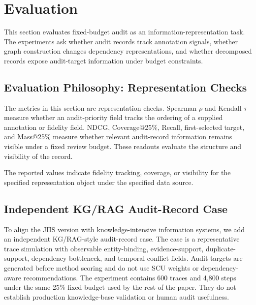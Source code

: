 \documentclass[pdflatex,sn-mathphys-num,iicol]{sn-jnl}
\begin{document}
\FloatBarrier

\section{Evaluation}
\label{sec:application}
\label{sec:experimental-results}

This section evaluates fixed-budget audit as an information-representation task. The experiments ask whether audit records track annotation signals, whether graph construction changes dependency representations, and whether decomposed records expose audit-target information under budget constraints.

\subsection{Evaluation Philosophy: Representation Checks}
\label{sec:evaluation-philosophy}

The metrics in this section are representation checks. Spearman $\rho$ and Kendall $\tau$ measure whether an audit-priority field tracks the ordering of a supplied annotation or fidelity field. NDCG, Coverage@25\%, Recall, first-selected target, and Mass@25\% measure whether relevant audit-record information remains visible under a fixed review budget. These readouts evaluate the structure and visibility of the record.

The reported values indicate fidelity tracking, coverage, or visibility for the specified representation object under the specified data source.

\subsection{Independent KG/RAG Audit-Record Case}
\label{sec:jiis-audit-case}

To align the JIIS version with knowledge-intensive information systems, we add an independent KG/RAG-style audit-record case. The case is a representative trace simulation with observable entity-binding, evidence-support, duplicate-support, dependency-bottleneck, and temporal-conflict fields. Audit targets are generated before method scoring and do not use SCU weights or dependency-aware recommendations. The experiment contains 600 traces and 4,800 steps under the same 25\% fixed budget used by the rest of the paper. They do not establish production knowledge-base validation or human audit usefulness.
\end{document}
